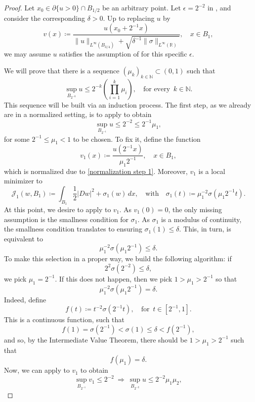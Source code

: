\documentclass[10pt,a4paper]{amsart}
\begin{document}
\begin{proof}
Let $x_0 \in \partial \{u>0\} \cap B_{1/2}$ be an arbitrary point. Let $\epsilon = 2^{-2}$ in , and consider the corresponding $\delta >0$. Up to replacing $u$ by
$$
    v(x) \coloneqq \frac{u(x_0 + 2^{-1}x)}{\|u\|_{L^\infty(B_{3/4})} + \sqrt{\delta^{-1}\|\sigma\|_{L^\infty(\mathbb{R})}}}, \quad x \in B_1,
$$
we may assume $u$ satisfies the assumption of  for this specific $\epsilon$.

We will prove that there is a sequence $(\mu_k)_{k \in \mathbb{N}} \subset (0,1)$ such that
$$
    \sup_{B_{2^{-k}}}u \leq 2^{-k}\left(\prod_{i=1}^{k}\mu_i\right), \quad \text{for every }\, k \in \mathbb{N}.
$$
This sequence will be built via an induction process. The first step, as we already are in a normalized setting, is to apply  to obtain
\begin{equation}\label{normalization step 1}
    \sup_{B_{2^{-1}}} u \leq  2^{-2} \leq 2^{-1} \mu_1,
\end{equation}
for some $2^{-1} \leq \mu_1 < 1$ to be chosen. To fix it, define the function
$$
    v_1(x) \coloneqq \frac{u\left(2^{-1}x\right)}{\mu_1 2^{-1}}, \quad x \in B_1,
$$
which is normalized due to \eqref{normalization step 1}. Moreover, $v_1$ is a local minimizer to
$$
    \mathcal{J}_1(w, B_1) \coloneqq \int_{B_1}\frac{1}{2}|Dw|^2 + \sigma_1(w)\, dx, \quad \text{with} 
    \quad \sigma_1(t) \coloneqq \mu_1^{-2}\sigma\left(\mu_1 2^{-1} t\right).
$$
At this point, we desire to apply  to $v_1$. As $v_1(0) = 0$, the only missing assumption is the smallness condition for $\sigma_1$. As $\sigma_1$ is a modulus of continuity, the smallness condition translates to ensuring $\sigma_1(1) \leq \delta$. This, in turn, is equivalent to
$$
    \mu_1^{-2}\sigma\left(\mu_1 2^{-1}\right) \leq \delta.
$$
To make this selection in a proper way, we build the following algorithm: if 
$$
   2^2\sigma\left(2^{-2}\right) \leq \delta,
$$
we pick $\mu_1 = 2^{-1}$. If this does not happen, then we pick $1 > \mu_1 > 2^{-1}$ so that
$$
    \mu_1^{-2}\sigma(\mu_1 2^{-1}) = \delta.
$$
Indeed, define
$$
    f(t) \coloneqq t^{-2} \sigma(2^{-1}t), \quad \text{for }\, t \in [2^{-1},1].
$$
This is a continuous function, such that 
$$f(1) = \sigma(2^{-1}) < \sigma(1) \leq \delta < f(2^{-1}),$$
and so, by the Intermediate Value Theorem, there should be $1 > \mu_1 > 2^{-1}$ such that 
$$
    f(\mu_1) = \delta.
$$
Now, we can apply  to $v_1$ to obtain
$$
    \sup_{B_{2^{-1}}} v_1 \leq 2^{-2} \ \Longrightarrow \ \sup_{B_{2^{-2}}} u \leq 2^{-2} \mu_1 \mu_2,
$$
\end{proof}
\end{document}
